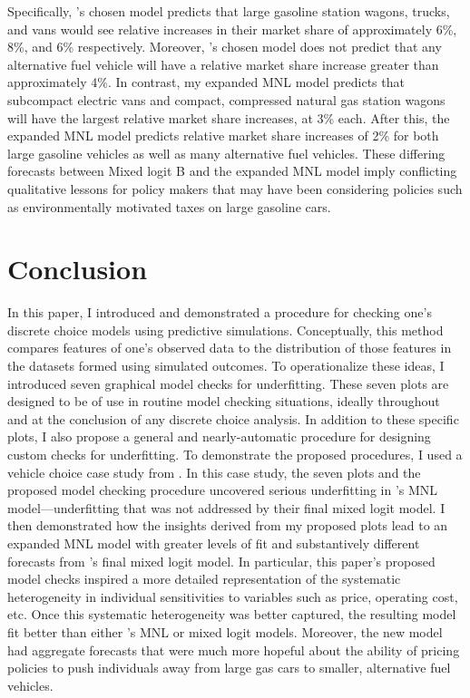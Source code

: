 \documentclass[preprint]{elsarticle}
\begin{document}
Specifically, \citeauthor{brownstone_forecasting_1998}'s chosen model predicts that large gasoline station wagons, trucks, and vans would see relative increases in their market share of approximately 6\%, 8\%, and 6\% respectively. Moreover, \citeauthor{brownstone_forecasting_1998}'s chosen model does not predict that any alternative fuel vehicle will have a relative market share increase greater than approximately 4\%. In contrast, my expanded MNL model predicts that subcompact electric vans and compact, compressed natural gas station wagons will have the largest relative market share increases, at 3\% each. After this, the expanded MNL model predicts relative market share increases of 2\% for both large gasoline vehicles as well as many alternative fuel vehicles. These differing forecasts between Mixed logit B and the expanded MNL model imply conflicting qualitative lessons for policy makers that may have been considering policies such as environmentally motivated taxes on large gasoline cars.


\section{Conclusion}
\label{sec:conclusion}
In this paper, I introduced and demonstrated a procedure for checking one's discrete choice models using predictive simulations. Conceptually, this method compares features of one's observed data to the distribution of those features in the datasets formed using simulated outcomes. To operationalize these ideas, I introduced seven graphical model checks for underfitting. These seven plots are designed to be of use in routine model checking situations, ideally throughout and at the conclusion of any discrete choice analysis. In addition to these specific plots, I also propose a general and nearly-automatic procedure for designing custom checks for underfitting. To demonstrate the proposed procedures, I used a vehicle choice case study from \citet{brownstone_forecasting_1998}. In this case study, the seven plots and the proposed model checking procedure uncovered serious underfitting in \citeauthor{brownstone_forecasting_1998}'s MNL model---underfitting that was not addressed by their final mixed logit model. I then demonstrated how the insights derived from my proposed plots lead to an expanded MNL model with greater levels of fit and substantively different forecasts from \citeauthor{brownstone_forecasting_1998}'s final mixed logit model. In particular, this paper's proposed model checks inspired a more detailed representation of the systematic heterogeneity in individual sensitivities to variables such as price, operating cost, etc. Once this systematic heterogeneity was better captured, the resulting model fit better than either \citeauthor{brownstone_forecasting_1998}'s MNL or mixed logit models. Moreover, the new model had aggregate forecasts that were much more hopeful about the ability of pricing policies to push individuals away from large gas cars to smaller, alternative fuel vehicles.
\end{document}
